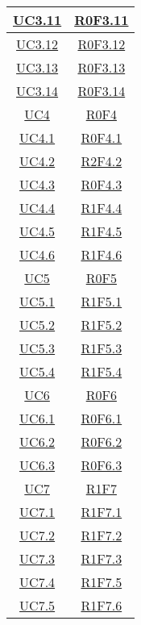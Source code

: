 \begin{longtable}{|c|c|}
\hline
\hyperlink{UC3.11}{UC3.11} & \hyperlink{R0F3.11}{R0F3.11}\\
\hline
\hyperlink{UC3.12}{UC3.12} & \hyperlink{R0F3.12}{R0F3.12}\\
\hline
\hyperlink{UC3.13}{UC3.13} & \hyperlink{R0F3.13}{R0F3.13}\\
\hline
\hyperlink{UC3.14}{UC3.14} & \hyperlink{R0F3.14}{R0F3.14}\\
\hline
\hyperlink{UC4}{UC4} & \hyperlink{R0F4}{R0F4}\\
\hline
\hyperlink{UC4.1}{UC4.1} & \hyperlink{R0F4.1}{R0F4.1}\\
\hline
\hyperlink{UC4.2}{UC4.2} & \hyperlink{R2F4.2}{R2F4.2}\\
\hline
\hyperlink{UC4.3}{UC4.3} & \hyperlink{R0F4.3}{R0F4.3}\\
\hline
\hyperlink{UC4.4}{UC4.4} & \hyperlink{R1F4.4}{R1F4.4}\\
\hline
\hyperlink{UC4.5}{UC4.5} & \hyperlink{R1F4.5}{R1F4.5}\\
\hline
\hyperlink{UC4.6}{UC4.6} & \hyperlink{R1F4.6}{R1F4.6}\\
\hline
\hyperlink{UC5}{UC5} & \hyperlink{R0F5}{R0F5}\\
\hline
\hyperlink{UC5.1}{UC5.1} & \hyperlink{R1F5.1}{R1F5.1}\\
\hline
\hyperlink{UC5.2}{UC5.2} & \hyperlink{R1F5.2}{R1F5.2}\\
\hline
\hyperlink{UC5.3}{UC5.3} & \hyperlink{R1F5.3}{R1F5.3}\\
\hline
\hyperlink{UC5.4}{UC5.4} & \hyperlink{R1F5.4}{R1F5.4}\\
\hline
\hyperlink{UC6}{UC6} & \hyperlink{R0F6}{R0F6}\\
\hline
\hyperlink{UC6.1}{UC6.1} & \hyperlink{R0F6.1}{R0F6.1}\\
\hline
\hyperlink{UC6.2}{UC6.2} & \hyperlink{R0F6.2}{R0F6.2}\\
\hline
\hyperlink{UC6.3}{UC6.3} & \hyperlink{R0F6.3}{R0F6.3}\\
\hline
\hyperlink{UC7}{UC7} & \hyperlink{R1F7}{R1F7}\\
\hline
\hyperlink{UC7.1}{UC7.1} & \hyperlink{R1F7.1}{R1F7.1}\\
\hline
\hyperlink{UC7.2}{UC7.2} & \hyperlink{R1F7.2}{R1F7.2}\\
\hline
\hyperlink{UC7.3}{UC7.3} & \hyperlink{R1F7.3}{R1F7.3}\\
\hline
\hyperlink{UC7.4}{UC7.4} & \hyperlink{R1F7.5}{R1F7.5}\\
\hline
\hyperlink{UC7.5}{UC7.5} & \hyperlink{R1F7.6}{R1F7.6}\\

\end{longtable}
